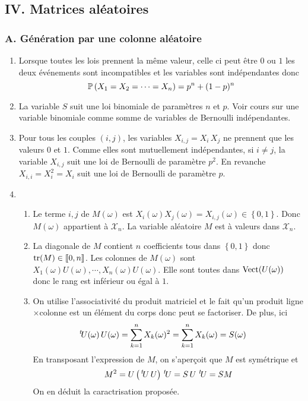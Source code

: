 \subsection*{IV. Matrices aléatoires}
\subsubsection*{A. Génération par une colonne aléatoire}
\begin{enumerate}
  \item Lorsque toutes les lois prennent la même valeur, celle ci peut être $0$ ou $1$ les deux événements sont incompatibles et les variables sont indépendantes donc
\begin{displaymath}
  \mathbb{P}\left( X_1=X_2=\cdots =X_n\right) = p^n + (1-p)^n
\end{displaymath}

  \item La variable $S$ suit une loi binomiale de paramètres $n$ et $p$. Voir cours sur une variable binomiale comme somme de variables de Bernoulli indépendantes.
  
  \item Pour tous les couples $(i,j)$, les variables $X_{i,j}=X_i\,X_j$ ne prennent que les valeurs $0$ et $1$. Comme elles sont mutuellement indépendantes, si $i\neq j$, la variable $X_{i,j}$ suit une loi de Bernoulli de paramètre $p^2$. En revanche $X_{i,i} = X_i^2 = X_i$ suit une loi de Bernoulli de paramètre $p$.
  \item 
\begin{enumerate}
  \item Le terme $i,j$ de $M(\omega)$ est $X_i(\omega)X_j(\omega)=X_{i,j}(\omega)\in\left\lbrace 0,1 \right\rbrace$. Donc $M(\omega)$ appartient à $\mathcal{X}_n$. La variable aléatoire $M$ est à valeurs dans $\mathcal{X}_n$.

  \item La diagonale de $M$ contient $n$ coefficients tous dans $\left\lbrace 0,1\right\rbrace$ donc $\operatorname{tr}(M)\in \llbracket 0,n\rrbracket$. Les colonnes de $M(\omega)$ sont $X_1(\omega)U(\omega), \cdots, X_n(\omega)U(\omega)$. Elle sont toutes dans $\operatorname{Vect}(U(\omega))$ donc le rang est inférieur ou égal à $1$.
  
  \item On utilise l'associativité du produit matriciel et le fait qu'un produit ligne$\times$colonne est un élément du corps donc peut se factoriser. De plus, ici 
\begin{displaymath}
  \,\mathstrut^t\! U(\omega) \,U(\omega) = \sum_{k=1}^n X_k(\omega)^2 = \sum_{k=1}^n X_k(\omega) = S(\omega)
\hspace{0.5cm}
\end{displaymath}
En transposant l'expression de $M$, on s'aperçoit que $M$ est symétrique et
\begin{displaymath}
  M^2 = U\left( \,\mathstrut^t\! U\, U\right) \,\mathstrut^t\! U = S\, U\,\,\mathstrut^t\! U = S M 
\end{displaymath}
On en déduit la caractrisation proposée.
\end{enumerate}
  

\end{enumerate}
